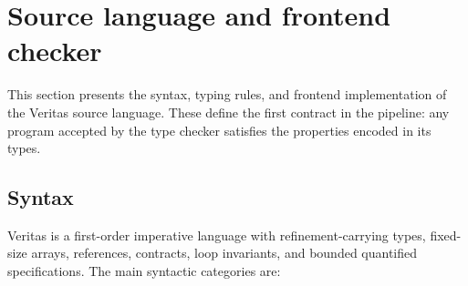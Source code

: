 \section{Source language and frontend checker}\label{sec:source-language}

This section presents the syntax, typing rules, and frontend implementation of the Veritas source language. These define the first contract in the pipeline: any program accepted by the type checker satisfies the properties encoded in its types.

\subsection{Syntax}

Veritas is a first-order imperative language with refinement-carrying types, fixed-size arrays, references, contracts, loop invariants, and bounded quantified specifications. The main syntactic categories are:
